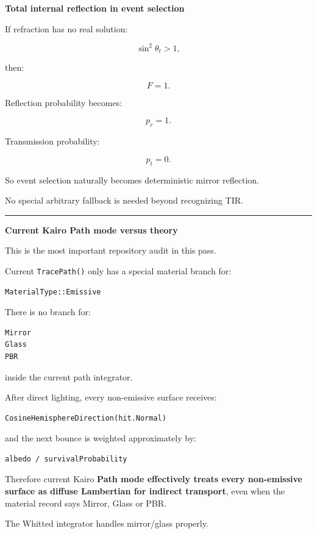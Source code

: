 \textbf{Total internal reflection in event selection}

If refraction has no real solution:

\[
\sin^2\theta_t>1,
\]

then:

\[
F=1.
\]

Reflection probability becomes:

\[
p_r=1.
\]

Transmission probability:

\[
p_t=0.
\]

So event selection naturally becomes deterministic mirror reflection.

No special arbitrary fallback is needed beyond recognizing TIR.

\begin{center}\rule{0.5\linewidth}{0.5pt}\end{center}

\textbf{Current Kairo Path mode versus theory}

This is the most important repository audit in this pass.

Current \texttt{TracePath()} only has a special material branch for:

\begin{verbatim}
MaterialType::Emissive
\end{verbatim}

There is no branch for:

\begin{verbatim}
Mirror
Glass
PBR
\end{verbatim}

inside the current path integrator.

After direct lighting, every non-emissive surface receives:

\begin{verbatim}
CosineHemisphereDirection(hit.Normal)
\end{verbatim}

and the next bounce is weighted approximately by:

\begin{verbatim}
albedo / survivalProbability
\end{verbatim}

Therefore current Kairo \textbf{Path mode effectively treats every non-emissive surface as diffuse Lambertian for indirect transport}, even when the material record says Mirror, Glass or PBR.

The Whitted integrator handles mirror/glass properly.

